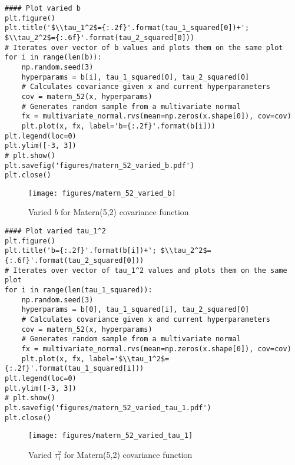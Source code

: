 \documentclass[10pt]{article}
\begin{document}
\begin{enumerate}[label=(\Alph*)]
        \begin{lstlisting}
#### Plot varied b
plt.figure()
plt.title('$\\tau_1^2$={:.2f}'.format(tau_1_squared[0])+'; $\\tau_2^2$={:.6f}'.format(tau_2_squared[0]))
# Iterates over vector of b values and plots them on the same plot
for i in range(len(b)):
    np.random.seed(3)
    hyperparams = b[i], tau_1_squared[0], tau_2_squared[0]
    # Calculates covariance given x and current hyperparameters
    cov = matern_52(x, hyperparams)
    # Generates random sample from a multivariate normal
    fx = multivariate_normal.rvs(mean=np.zeros(x.shape[0]), cov=cov)
    plt.plot(x, fx, label='b={:.2f}'.format(b[i]))
plt.legend(loc=0)
plt.ylim([-3, 3])
# plt.show()
plt.savefig('figures/matern_52_varied_b.pdf')
plt.close()
        \end{lstlisting}

        \begin{figure}[ht] 
          \centering 
          \texttt{[image: figures/matern\_52\_varied\_b]}
          \caption{\label{fig:matern_52_varied_b} Varied $b$ for Matern(5,2) covariance function}
        \end{figure}

        \clearpage

        \begin{lstlisting}
#### Plot varied tau_1^2
plt.figure()
plt.title('b={:.2f}'.format(b[i])+'; $\\tau_2^2$={:.6f}'.format(tau_2_squared[0]))
# Iterates over vector of tau_1^2 values and plots them on the same plot
for i in range(len(tau_1_squared)):
    np.random.seed(3)
    hyperparams = b[0], tau_1_squared[i], tau_2_squared[0]
    # Calculates covariance given x and current hyperparameters
    cov = matern_52(x, hyperparams)
    # Generates random sample from a multivariate normal
    fx = multivariate_normal.rvs(mean=np.zeros(x.shape[0]), cov=cov)
    plt.plot(x, fx, label='$\\tau_1^2$={:.2f}'.format(tau_1_squared[i]))
plt.legend(loc=0)
plt.ylim([-3, 3])
# plt.show()
plt.savefig('figures/matern_52_varied_tau_1.pdf')
plt.close()
        \end{lstlisting}

        \begin{figure}[h] 
          \centering 
          \texttt{[image: figures/matern\_52\_varied\_tau\_1]}
          \caption{\label{fig:matern_52_varied_tau_1} Varied $\tau_1^2$ for Matern(5,2) covariance function}
        \end{figure}


\end{enumerate}
\end{document}
